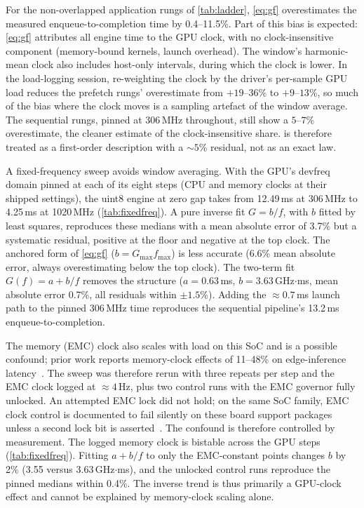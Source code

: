 For the non-overlapped application rungs of \cref{tab:ladder},
\cref{eq:gf} overestimates the measured enqueue-to-completion time by
0.4--11.5\%. Part of this bias is expected: \cref{eq:gf} attributes all
engine time to the GPU clock, with no clock-insensitive component
(memory-bound kernels, launch overhead). The window's harmonic-mean
clock also includes host-only intervals, during which the clock is
lower. In the load-logging session, re-weighting the clock by the
driver's per-sample GPU load reduces the prefetch rungs' overestimate
from $+19$--$36$\% to $+9$--$13$\%, so much of the bias where the clock
moves is a sampling artefact of the window average. The sequential
rungs, pinned at 306\,MHz throughout, still show a $5$--$7$\%
overestimate, the cleaner estimate of the clock-insensitive share.
 is therefore treated as a first-order description with a
${\sim}5$\% residual, not as an exact law.

A fixed-frequency sweep avoids window averaging. With the GPU's
devfreq domain pinned at each of its eight steps (CPU and memory clocks
at their shipped settings), the uint8 engine at zero gap takes from 12.49\,ms at 306\,MHz to 4.25\,ms at
1020\,MHz (\cref{tab:fixedfreq}). A pure inverse fit $G=b/f$, with $b$
fitted by least squares, reproduces these medians with a mean absolute
error of 3.7\% but a systematic residual, positive at the floor and
negative at the top clock. The anchored form of \cref{eq:gf}
($b=G_{\max}f_{\max}$) is less accurate (6.6\% mean absolute error,
always overestimating below the top clock). The two-term fit
$G(f)=a+b/f$ removes the structure ($a=0.63$\,ms,
$b=3.63$\,GHz$\cdot$ms, mean absolute error 0.7\%, all residuals within
$\pm1.5$\%). Adding the ${\approx}0.7$\,ms launch path to the pinned
306\,MHz time reproduces the sequential pipeline's 13.2\,ms
enqueue-to-completion.

The memory (EMC) clock also scales with load on this SoC and is a
possible confound; prior work reports memory-clock effects of 11--48\%
on edge-inference latency~\cite{kang2026emc}. The sweep was therefore
rerun with three repeats per step and the EMC clock logged at
${\approx}4$\,Hz, plus two control runs with the EMC governor fully
unlocked. An attempted EMC lock did not hold; on the same SoC family,
EMC clock control is documented to fail silently on these board support
packages unless a second lock bit is asserted~\cite{kang2026emc}. The
confound is therefore controlled by measurement. The logged memory
clock is bistable across the GPU steps (\cref{tab:fixedfreq}). Fitting
$a{+}b/f$ to only the EMC-constant points changes $b$ by 2\% (3.55
versus 3.63\,GHz$\cdot$ms), and the unlocked control runs reproduce the
pinned medians within 0.4\%. The inverse trend is thus primarily a
GPU-clock effect and cannot be explained by memory-clock scaling alone.

